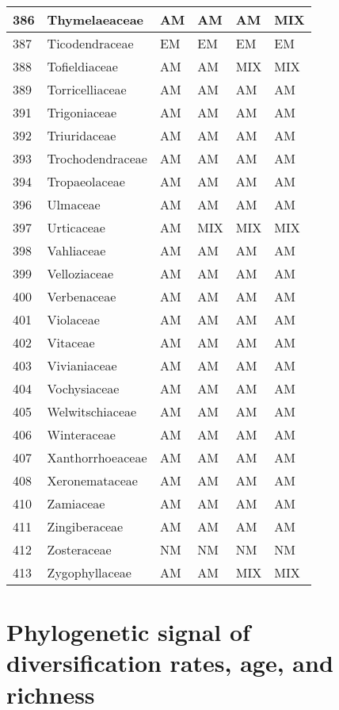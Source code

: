 \documentclass[]{article}
\begin{document}
\begin{longtable}{l|l|l|l|l|l}
\hline
386 & Thymelaeaceae & AM & AM & AM & MIX\\
\hline
387 & Ticodendraceae & EM & EM & EM & EM\\
\hline
388 & Tofieldiaceae & AM & AM & MIX & MIX\\
\hline
389 & Torricelliaceae & AM & AM & AM & AM\\
\hline
391 & Trigoniaceae & AM & AM & AM & AM\\
\hline
392 & Triuridaceae & AM & AM & AM & AM\\
\hline
393 & Trochodendraceae & AM & AM & AM & AM\\
\hline
394 & Tropaeolaceae & AM & AM & AM & AM\\
\hline
396 & Ulmaceae & AM & AM & AM & AM\\
\hline
397 & Urticaceae & AM & MIX & MIX & MIX\\
\hline
398 & Vahliaceae & AM & AM & AM & AM\\
\hline
399 & Velloziaceae & AM & AM & AM & AM\\
\hline
400 & Verbenaceae & AM & AM & AM & AM\\
\hline
401 & Violaceae & AM & AM & AM & AM\\
\hline
402 & Vitaceae & AM & AM & AM & AM\\
\hline
403 & Vivianiaceae & AM & AM & AM & AM\\
\hline
404 & Vochysiaceae & AM & AM & AM & AM\\
\hline
405 & Welwitschiaceae & AM & AM & AM & AM\\
\hline
406 & Winteraceae & AM & AM & AM & AM\\
\hline
407 & Xanthorrhoeaceae & AM & AM & AM & AM\\
\hline
408 & Xeronemataceae & AM & AM & AM & AM\\
\hline
410 & Zamiaceae & AM & AM & AM & AM\\
\hline
411 & Zingiberaceae & AM & AM & AM & AM\\
\hline
412 & Zosteraceae & NM & NM & NM & NM\\
\hline
413 & Zygophyllaceae & AM & AM & MIX & MIX\\
\hline
\end{longtable}

\hypertarget{phylogenetic-signal-of-diversification-rates-age-and-richness}{%
\section{Phylogenetic signal of diversification rates, age, and
richness}\label{phylogenetic-signal-of-diversification-rates-age-and-richness}}
\end{document}
